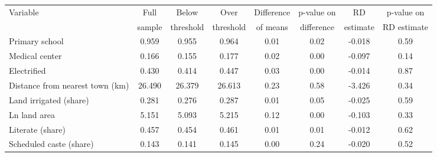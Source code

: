 \setlength{\linewidth}{.1cm} \begin{center} 
{\begin{tabular}{l c c c c c c c}
\hline\hline 
Variable                           & Full                              & Below                           & Over                            & Difference                      & p-value on                      & RD                                & p-value on                     \\ 
                                   & sample                            & threshold                       & threshold                       & of means                        & difference                      & estimate                          & RD estimate                    \\ 
\hline                                                               
Primary school                     & 0.959           & 0.955           & 0.964           & 0.01           & 0.02           & -0.018           & 0.59           \\
Medical center                     & 0.166               & 0.155               & 0.177               & 0.02               & 0.00               & -0.097               & 0.14               \\
Electrified                        & 0.430                    & 0.414                    & 0.447                    & 0.03                    & 0.00                    & -0.014                    & 0.87                \\
Distance from nearest town (km)    & 26.490                    & 26.379                    & 26.613                    & 0.23                    & 0.58                    & -3.426                    & 0.34                    \\
Land irrigated (share)             & 0.281                & 0.276                & 0.287                & 0.01                & 0.05                & -0.025                & 0.59                \\
Ln land area                       & 5.151                  & 5.093                  & 5.215                  & 0.12                  & 0.00                  & -0.103                  & 0.33                  \\
Literate (share)                   & 0.457           & 0.454           & 0.461           & 0.01           & 0.01           & -0.012           & 0.62           \\
Scheduled caste (share)            & 0.143            & 0.141            & 0.145            & 0.00            & 0.24            & -0.020            & 0.52            \\

\end{tabular}}
\end{center}
